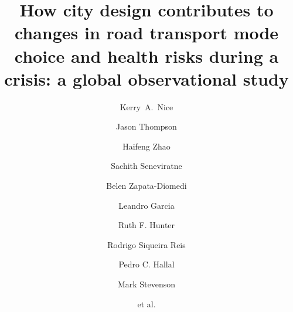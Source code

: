 \documentclass[preprint,12pt]{elsarticle}
\begin{document}
\begin{frontmatter}



\title{How city design contributes to changes in road transport mode choice and health risks during a crisis: a global observational study}


\author[melb]{Kerry~A.~Nice}
\author[melb]{Jason Thompson}
\author[melb]{Haifeng Zhao}
\author[melb]{Sachith Seneviratne}
\author[RMII]{Belen Zapata-Diomedi}
\author[Belfast]{Leandro Garcia}
\author[Belfast]{Ruth F. Hunter}
\author[wash]{Rodrigo Siqueira Reis}
\author[uill]{Pedro C. Hallal}
\author[melb,eng]{Mark Stevenson}
\author[]{et al.}

\address[melb]{Transport, Health, and Urban Systems Research Lab, Faculty of Architecture, Building, and Planning, University of Melbourne, VIC, Australia.}
\address[RMII]{Healthy Liveable Cities Lab, Centre for Urban Research, RMIT University, Melbourne, Australia.}
\address[Belfast]{Centre for Public Health, Queen’s University Belfast, Institute of Clinical Sciences B, Belfast, Northern Ireland, UK.}
\address[wash]{Washington University, St. Louis, Missouri, US.}
\address[eng]{Faculty of Engineering and Information Technology and the Melbourne School of Population and Global Health, University of Melbourne, VIC, Australia.}
\address[uill]{Department of Kinesiology and Community Health, University of Illinois Urbana-Champaign}


\end{frontmatter}
\end{document}
